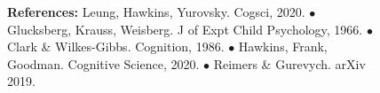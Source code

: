 \documentclass[11pt,a4paper]{article}
\begin{document}
\begin{figure}
	\begin{small} \textbf{References:}
Leung, Hawkins, Yurovsky. Cogsci, 2020. $\bullet$ Glucksberg, Krauss, Weisberg. J of Expt Child Psychology, 1966. $\bullet$ Clark \& Wilkes-Gibbs. Cognition, 1986. $\bullet$ Hawkins, Frank, Goodman. Cognitive Science, 2020. $\bullet$ Reimers \& Gurevych. arXiv 2019.
\end{small}
\end{figure}
\end{document}
